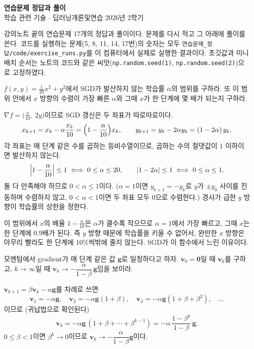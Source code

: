 \documentclass[11pt,a4paper]{article}
\begin{document}
\begin{center}
{\LARGE\bfseries 연습문제 정답과 풀이}\\[0.35em]
{\large 학습 관련 기술 $\cdot$ 딥러닝개론및연습 2026년 2학기}
\end{center}

강의노트 끝의 연습문제 17개의 정답과 풀이이다. 문제를 다시 적고 그 아래에 풀이를 쓴다.
코드를 실행하는 문제(5, 8, 11, 14, 17번)의 숫자는 모두 \texttt{연습문제\_정답/code/exercise\_runs.py}를
이 컴퓨터에서 실제로 실행한 결과이다.
초깃값과 미니배치 순서는 노트의 코드와 같은 씨앗(\texttt{np.random.seed(1)}, \texttt{np.random.seed(2)})으로 고정하였다.

\begin{problems}

\item $f(x,y)=\frac{1}{20}x^2+y^2$에서 SGD가 발산하지 않는 학습률 $\alpha$의 범위를 구하라.
또 이 범위 안에서 $x$ 방향의 수렴이 가장 빠른 $\alpha$와 그때 $x$가 한 단계에 몇 배가 되는지 구하라.

\begin{sol}
$\nabla f=\bigl(\frac{x}{10},\ 2y\bigr)$이므로 SGD 갱신은 두 좌표가 따로따로이다.
\[
x_{k+1}=x_k-\alpha\frac{x_k}{10}=\Bigl(1-\frac{\alpha}{10}\Bigr)x_k,\qquad
y_{k+1}=y_k-2\alpha y_k=(1-2\alpha)\,y_k .
\]
각 좌표는 매 단계 같은 수를 곱하는 등비수열이므로, 곱하는 수의 절댓값이 $1$ 이하이면 발산하지 않는다.
\[
\Bigl|1-\frac{\alpha}{10}\Bigr|\le1\iff0\le\alpha\le20,\qquad
|1-2\alpha|\le1\iff0\le\alpha\le1 .
\]
둘 다 만족해야 하므로 $\boxed{0<\alpha\le1}$이다.
($\alpha=1$이면 $y_{k+1}=-y_k$로 $y$가 $\pm y_0$ 사이를 진동하며 수렴하지 않고, $0<\alpha<1$이면 두 좌표 모두 $0$으로 수렴한다.)
경사가 급한 $y$ 방향이 학습률의 상한을 정한다.

이 범위에서 $x$의 배율 $1-\frac{\alpha}{10}$은 $\alpha$가 클수록 작으므로 $\alpha=1$에서 가장 빠르고,
그때 $x$는 한 단계에 $\boxed{0.9}$배가 된다.
즉 $y$ 방향 때문에 학습률을 키울 수 없어서, 완만한 $x$ 방향은 아무리 빨라도 한 단계에 $10\%$씩밖에 줄지 않는다.
SGD가 이 함수에서 느린 이유이다.
\end{sol}

\item 모멘텀에서 gradient가 매 단계 같은 값 $\bm g$로 일정하다고 하자.
$\bm v_0=\bm 0$일 때 $\bm v_k$를 구하고, $k\to\infty$일 때 $\bm v_k\to-\dfrac{\alpha}{1-\beta}\,\bm g$임을 보이라.

\begin{sol}
$\bm v_{k+1}=\beta\bm v_k-\alpha\bm g$를 차례로 쓰면
\[
\bm v_1=-\alpha\bm g,\quad
\bm v_2=-\alpha\bm g(1+\beta),\quad
\bm v_3=-\alpha\bm g(1+\beta+\beta^2),\quad\ldots
\]
이므로 (귀납법으로 확인된다)
\[
\bm v_k=-\alpha\bm g\,(1+\beta+\cdots+\beta^{k-1})=-\alpha\,\frac{1-\beta^k}{1-\beta}\,\bm g .
\]
$0\le\beta<1$이면 $\beta^k\to0$이므로 $\bm v_k\to-\dfrac{\alpha}{1-\beta}\bm g$이다.


\end{sol}
\end{problems}
\end{document}
